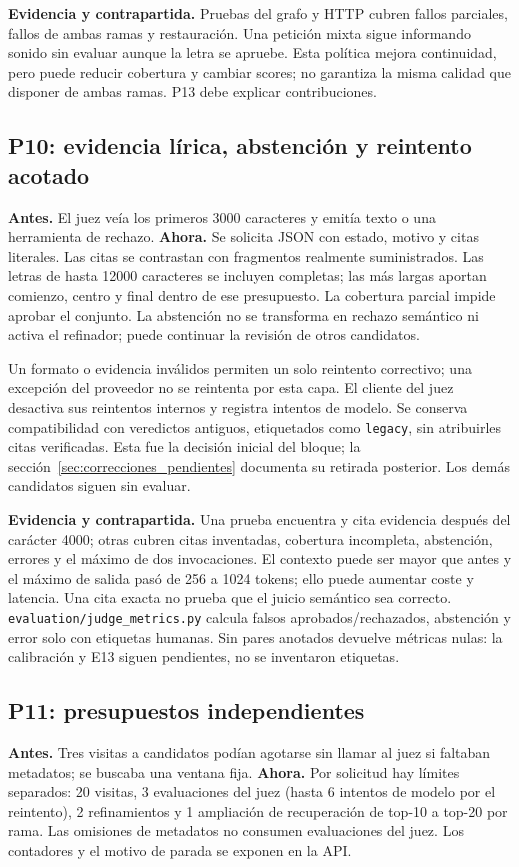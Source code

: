 \textbf{Evidencia y contrapartida.} Pruebas del grafo y HTTP cubren fallos
parciales, fallos de ambas ramas y restauración. Una petición mixta sigue
informando sonido sin evaluar aunque la letra se apruebe. Esta política mejora
continuidad, pero puede reducir cobertura y cambiar scores; no garantiza la
misma calidad que disponer de ambas ramas. P13 debe explicar contribuciones.

\subsection{P10: evidencia lírica, abstención y reintento acotado}
\textbf{Antes.} El juez veía los primeros 3000 caracteres y emitía texto o una
herramienta de rechazo. \textbf{Ahora.} Se solicita JSON con estado, motivo y
citas literales. Las citas se contrastan con fragmentos realmente suministrados.
Las letras de hasta 12000 caracteres se incluyen completas; las más largas
aportan comienzo, centro y final dentro de ese presupuesto. La cobertura parcial
impide aprobar el conjunto. La abstención no se transforma en rechazo semántico
ni activa el refinador; puede continuar la revisión de otros candidatos.

Un formato o evidencia inválidos permiten un solo reintento correctivo;
una excepción del proveedor no se reintenta por esta capa. El cliente del juez
desactiva sus reintentos internos y registra intentos de modelo. Se conserva
compatibilidad con veredictos antiguos, etiquetados como \texttt{legacy}, sin
atribuirles citas verificadas. Esta fue la decisión inicial del bloque;
la sección~\ref{sec:correcciones_pendientes} documenta su retirada posterior.
Los demás candidatos siguen sin evaluar.

\textbf{Evidencia y contrapartida.} Una prueba encuentra y cita evidencia
después del carácter 4000; otras cubren citas inventadas, cobertura incompleta,
abstención, errores y el máximo de dos invocaciones. El contexto puede ser mayor
que antes y el máximo de salida pasó de 256 a 1024 tokens; ello puede aumentar
coste y latencia. Una cita exacta no prueba que el juicio semántico sea correcto.
\texttt{evaluation/judge\_metrics.py} calcula falsos aprobados/rechazados,
abstención y error solo con etiquetas humanas. Sin pares anotados devuelve
métricas nulas: la calibración y E13 siguen pendientes, no se inventaron etiquetas.

\subsection{P11: presupuestos independientes}
\textbf{Antes.} Tres visitas a candidatos podían agotarse sin llamar al juez
si faltaban metadatos; se buscaba una ventana fija. \textbf{Ahora.} Por solicitud
hay límites separados: 20 visitas, 3 evaluaciones del juez (hasta 6 intentos de
modelo por el reintento), 2 refinamientos y 1 ampliación de recuperación de
top-10 a top-20 por rama. Las omisiones de metadatos no consumen evaluaciones
del juez. Los contadores y el motivo de parada se exponen en la API.


